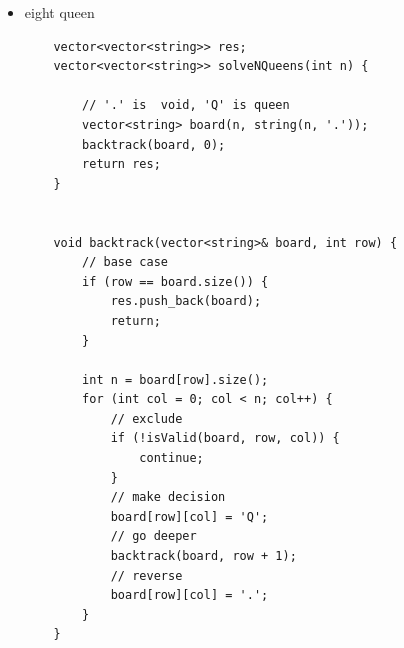 \documentclass[a4paper,11pt,twoside]{book}
\begin{document}
\begin{itemize}
\begin{lstlisting}
				dp[i][w] = dp[i - 1][w];
			}
			else {
				
				dp[i][w] = max(
				dp[i - 1][w - wt[i - 1]] + val[i - 1],
				dp[i - 1][w]
				);
			}
		}
	}
	
	for (int i = 1; i <= N; i++) {
		for (int w = 1; w <= W; w++) {
			cout << dp[i][w] << " ";
		}
		cout << endl;
	}
	
	return dp[N][W];
}

/* 
0 40 40 40 40 40 40 40 40 40
0 40 40 50 50 90 90 90 90 90
0 100 100 140 140 150 150 190 190 190
0 100 100 140 140 150 195 195 235 235
0 100 100 140 140 150 195 195 235 235
*/


int main()
{
	int W = 10;   // Weight of knapsack
	Item arr[] = { {2, 40}, {3.14, 50}, {1.98, 100},
		{5, 95}, {3, 30} };
	int n = sizeof(arr) / sizeof(arr[0]);
	
	cout << "Maximum possible profit = "
	<< knapsack(W, arr, n) << endl;
	
	//dp 
	knapsack_dp();
	
	//back track
	cout<<"back track"<< knapsack_back(W, arr, n) << endl;	
	return 0;
}
\end{lstlisting}


\item eight queen
\begin{lstlisting}
	vector<vector<string>> res;
	vector<vector<string>> solveNQueens(int n) {
		
		// '.' is  void, 'Q' is queen
		vector<string> board(n, string(n, '.'));
		backtrack(board, 0);
		return res;
	}
	
	
	void backtrack(vector<string>& board, int row) {
		// base case
		if (row == board.size()) {
			res.push_back(board);
			return;
		}
		
		int n = board[row].size();
		for (int col = 0; col < n; col++) {
			// exclude
			if (!isValid(board, row, col)) {
				continue;
			}
			// make decision
			board[row][col] = 'Q';
			// go deeper
			backtrack(board, row + 1);
			// reverse
			board[row][col] = '.';
		}
	}
\end{lstlisting}


\end{itemize}
\end{document}

